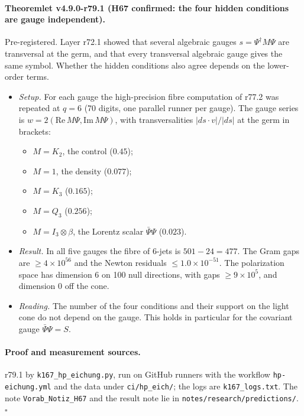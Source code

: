\paragraph{Theoremlet v4.9.0-r79.1 (H67 confirmed: the four hidden conditions are gauge independent).}
Pre-registered.  Layer r72.1 showed that several algebraic gauges \(s=\Psi^\dagger M\Psi\) are transversal at the germ, and
that every transversal algebraic gauge gives the same symbol.  Whether the hidden conditions also agree depends on the
lower-order terms.
\begin{itemize}[leftmargin=2em]
\item \emph{Setup.}  For each gauge the high-precision fibre computation of r77.2 was repeated at \(q=6\) (70 digits, one
parallel runner per gauge).  The gauge series is \(w=2(\mathrm{Re}\,M\Psi,\mathrm{Im}\,M\Psi)\), with transversalities
\(|ds\cdot v|/|ds|\) at the germ in brackets:
  \begin{itemize}
  \item \(M=K_2\), the control (\(0.45\));
  \item \(M=1\), the density (\(0.077\));
  \item \(M=K_3\) (\(0.165\));
  \item \(M=Q_3\) (\(0.256\));
  \item \(M=I_3\otimes\beta\), the Lorentz scalar \(\bar\Psi\Psi\) (\(0.023\)).
  \end{itemize}
\item \emph{Result.}  In all five gauges the fibre of 6-jets is \(501-24=477\).  The Gram gaps are \(\ge4\times10^{56}\) and the
Newton residuals \(\le1.0\times10^{-51}\).  The polarization space has dimension 6 on 100 null directions, with gaps
\(\ge9\times10^5\), and dimension 0 off the cone.
\item \emph{Reading.}  The number of the four conditions and their support on the light cone do not depend on the gauge.  This
holds in particular for the covariant gauge \(\bar\Psi\Psi=S\).
\end{itemize}

\paragraph{Proof and measurement sources.}
r79.1 by \texttt{k167\_hp\_eichung.py}, run on GitHub runners with the workflow \texttt{hp-eichung.yml} and the data under
\texttt{ci/\allowbreak hp\_eich/}; the logs are \texttt{k167\_logs.txt}.  The note \texttt{Vorab\_\allowbreak Notiz\_\allowbreak H67}
and the result note lie in \texttt{notes/\allowbreak research/\allowbreak predictions/}.  \(\square\)


